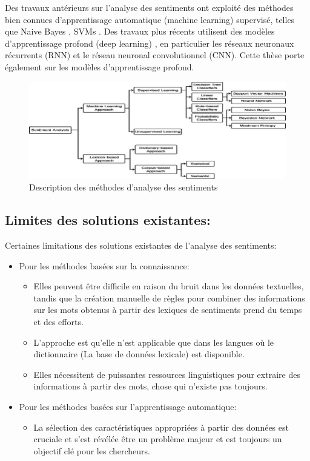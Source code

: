 Des travaux antérieurs sur l'analyse des sentiments ont exploité des méthodes bien connues d'apprentissage automatique (machine learning) supervisé, telles que Naive Bayes \cite{martinez2006learning}, SVMs \cite{vinet2011missing, ho1995random,wahid2017prestasi}. Des travaux plus récents utilisent des modèles d'apprentissage profond (deep learning) \cite{goldberg2017neural}, en particulier les réseaux neuronaux récurrents (RNN) et le réseau neuronal convolutionnel (CNN). Cette thèse porte également sur les modèles d'apprentissage profond.
\begin{figure}[H]
    \centering
    \includegraphics[width=\textwidth]{chapitre3/assets/sentiment-analysis-methods.jpg}
    \caption{Description des méthodes d'analyse des sentiments}
    \label{fig:my_label}
\end{figure}
\subsection{Limites des solutions existantes:}
Certaines limitations des solutions existantes de l'analyse des sentiments:
\begin{itemize}
    \item \textcolor{DispositionColor}{Pour les méthodes basées sur la connaissance:}
    \begin{itemize}
        \item Elles peuvent être difficile en raison du bruit dans les données textuelles, tandis que la création manuelle de règles pour combiner des informations sur les mots obtenus à partir des lexiques de sentiments prend du temps et des efforts.
        \item L'approche est qu'elle n'est applicable que dans les langues où le dictionnaire (La base de données lexicale) est disponible.
        \item Elles nécessitent de puissantes ressources linguistiques pour extraire des informations à partir des mots, chose qui n'existe pas toujours.
    \end{itemize}
    \item \textcolor{DispositionColor}{Pour les méthodes basées sur l'apprentissage automatique:}
    \begin{itemize}
        \item La sélection des caractéristiques appropriées à partir des données est cruciale et s'est révélée être un problème majeur et est toujours un objectif clé pour les chercheurs.
    \end{itemize}
\end{itemize}  
